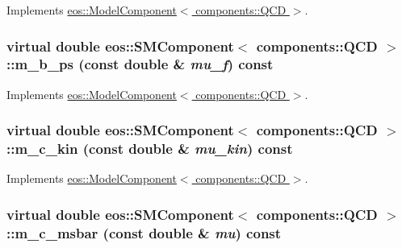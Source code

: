 Implements \hyperlink{classeos_1_1ModelComponent_3_01components_1_1QCD_01_4_a372e8a7dced706f571b33bc18256e324}{eos::ModelComponent$<$ components::QCD $>$}.\hypertarget{classeos_1_1SMComponent_3_01components_1_1QCD_01_4_a2f052ffa95426e07ab019fa275ce41d9}{
\subsubsection[{m\_\-b\_\-ps}]{\setlength{\rightskip}{0pt plus 5cm}virtual double eos::SMComponent$<$ components::QCD $>$::m\_\-b\_\-ps (const double \& {\em mu\_\-f}) const}}
\label{classeos_1_1SMComponent_3_01components_1_1QCD_01_4_a2f052ffa95426e07ab019fa275ce41d9}


Implements \hyperlink{classeos_1_1ModelComponent_3_01components_1_1QCD_01_4_a654bbcce7c337f15ca6f2072da24463d}{eos::ModelComponent$<$ components::QCD $>$}.\hypertarget{classeos_1_1SMComponent_3_01components_1_1QCD_01_4_a346c272825a490a9f5884af8b8ceebfe}{
\subsubsection[{m\_\-c\_\-kin}]{\setlength{\rightskip}{0pt plus 5cm}virtual double eos::SMComponent$<$ components::QCD $>$::m\_\-c\_\-kin (const double \& {\em mu\_\-kin}) const}}
\label{classeos_1_1SMComponent_3_01components_1_1QCD_01_4_a346c272825a490a9f5884af8b8ceebfe}


Implements \hyperlink{classeos_1_1ModelComponent_3_01components_1_1QCD_01_4_a0cd270cd7c6528f41a34cfc1e70bf056}{eos::ModelComponent$<$ components::QCD $>$}.\hypertarget{classeos_1_1SMComponent_3_01components_1_1QCD_01_4_af1f05d988210a50359490a150d9170e0}{
\subsubsection[{m\_\-c\_\-msbar}]{\setlength{\rightskip}{0pt plus 5cm}virtual double eos::SMComponent$<$ components::QCD $>$::m\_\-c\_\-msbar (const double \& {\em mu}) const}}
\label{classeos_1_1SMComponent_3_01components_1_1QCD_01_4_af1f05d988210a50359490a150d9170e0}


